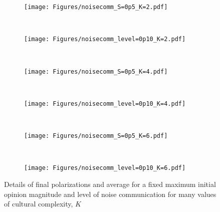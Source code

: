 \begin{figure}[t!]
  \centering
      \begin{subfigure}[t]{0.49\textwidth}
          \centering
          \texttt{[image: Figures/noisecomm\_S=0p5\_K=2.pdf]}
          \caption{}
      \end{subfigure}
      ~
      \begin{subfigure}[t]{0.49\textwidth}
          \centering
          \texttt{[image: Figures/noisecomm\_level=0p10\_K=2.pdf]}
          \caption{}
      \end{subfigure} \\
      \begin{subfigure}[t]{0.49\textwidth}
          \centering
          \texttt{[image: Figures/noisecomm\_S=0p5\_K=4.pdf]}
          \caption{}
      \end{subfigure}
      ~
      \begin{subfigure}[t]{0.49\textwidth}
          \centering
          \texttt{[image: Figures/noisecomm\_level=0p10\_K=4.pdf]}
          \caption{}
      \end{subfigure} \\
      \begin{subfigure}[t]{0.49\textwidth}
          \centering
          \texttt{[image: Figures/noisecomm\_S=0p5\_K=6.pdf]}
          \caption{}
      \end{subfigure}
      ~
      \begin{subfigure}[t]{0.49\textwidth}
          \centering
          \texttt{[image: Figures/noisecomm\_level=0p10\_K=6.pdf]}
          \caption{}
      \end{subfigure}
  \caption{Details of final polarizations and average for a fixed 
    maximum initial opinion magnitude and level of noise communication for many
    values of cultural complexity, $K$
  }
  \label{fig:single-runs-commnoise}
\end{figure}


